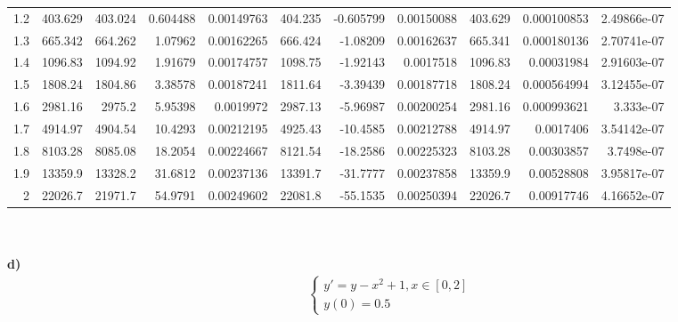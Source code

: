 {\begin{tabular}{rrrrrrrrrrr}
 1.2 &   403.629   &   403.024   &   0.604488    &   0.00149763  &   404.235   &  -0.605799    &   0.00150088  &   403.629   &   0.000100853 &   2.49866e-07 \\
 1.3 &   665.342   &   664.262   &   1.07962     &   0.00162265  &   666.424   &  -1.08209     &   0.00162637  &   665.341   &   0.000180136 &   2.70741e-07 \\
 1.4 &  1096.83    &  1094.92    &   1.91679     &   0.00174757  &  1098.75    &  -1.92143     &   0.0017518   &  1096.83    &   0.00031984  &   2.91603e-07 \\
 1.5 &  1808.24    &  1804.86    &   3.38578     &   0.00187241  &  1811.64    &  -3.39439     &   0.00187718  &  1808.24    &   0.000564994 &   3.12455e-07 \\
 1.6 &  2981.16    &  2975.2     &   5.95398     &   0.0019972   &  2987.13    &  -5.96987     &   0.00200254  &  2981.16    &   0.000993621 &   3.333e-07   \\
 1.7 &  4914.97    &  4904.54    &  10.4293      &   0.00212195  &  4925.43    & -10.4585      &   0.00212788  &  4914.97    &   0.0017406   &   3.54142e-07 \\
 1.8 &  8103.28    &  8085.08    &  18.2054      &   0.00224667  &  8121.54    & -18.2586      &   0.00225323  &  8103.28    &   0.00303857  &   3.7498e-07  \\
 1.9 & 13359.9     & 13328.2     &  31.6812      &   0.00237136  & 13391.7     & -31.7777      &   0.00237858  & 13359.9     &   0.00528808  &   3.95817e-07 \\
 2   & 22026.7     & 21971.7     &  54.9791      &   0.00249602  & 22081.8     & -55.1535      &   0.00250394  & 22026.7     &   0.00917746  &   4.16652e-07 \\
\hline
\end{tabular}
}
        \\
        \\
        \textbf{d)}
    \begin{align*}
    \begin{cases}
        y' = y - x^2 + 1, x \in [0, 2] \\
        y(0) = 0.5
    \end{cases}
    \end{align*}
    \\
